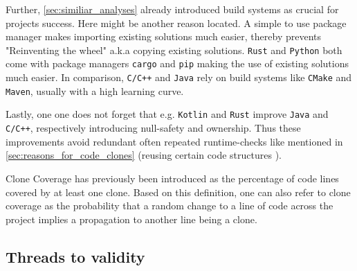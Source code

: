 Further, \autoref{sec:similiar_analyses} already introduced build systems as crucial for projects success. Here might be another reason located. A simple to use package manager makes importing existing solutions much easier, thereby prevents "Reinventing the wheel" a.k.a copying existing solutions. \texttt{Rust} and \texttt{Python} both come with package managers \texttt{cargo} and \texttt{pip} making the use of existing solutions much easier. In comparison, \texttt{C/C++} and \texttt{Java} rely on build systems like \texttt{CMake} and \texttt{Maven}, usually with a high learning curve.

Lastly, one one does not forget that e.g. \texttt{Kotlin} and \texttt{Rust} improve \texttt{Java} and \texttt{C/C++}, respectively introducing null-safety and ownership. Thus these improvements avoid redundant often repeated runtime-checks like mentioned in \autoref{sec:reasons_for_code_clones} (reusing certain code structures ).


Clone Coverage has previously been introduced as the percentage of code lines covered by at least one clone. Based on this definition, one can also refer to clone coverage as the probability that a random change to a line of code across the project implies a propagation to another line being a clone.

 
\subsection{Threads to validity}
 
